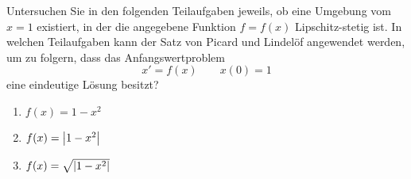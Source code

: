 \begin{exercisePage}
%
\begin{exercise}
	Untersuchen Sie in den folgenden Teilaufgaben jeweils, ob eine Umgebung vom $x=1$ existiert, in der die angegebene Funktion $f = f(x)$ Lipschitz-stetig ist. In welchen Teilaufgaben kann der Satz von Picard und Lindelöf angewendet werden, um zu folgern, dass das Anfangswertproblem
	\begin{equation*}
		x' = f(x) \qquad x(0) = 1
	\end{equation*}
	eine eindeutige Lösung besitzt?
	\begin{enumerate}[nolistsep]
		\item $f(x) = 1 - x^2$
		\item $f(x) = \left| 1 - x^2 \right|$
		\item $f(x) = \sqrt{\left|  1 - x^2 \right|}$
	\end{enumerate}
\end{exercise}


\end{exercisePage}
